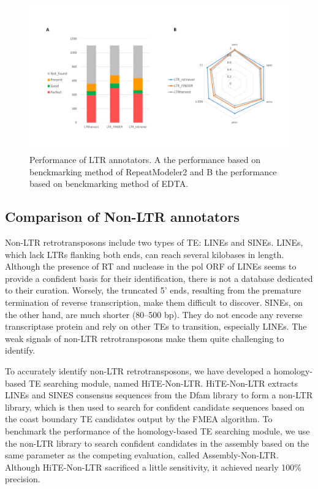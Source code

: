 \documentclass{bmcart}
\begin{document}
\begin{figure}[h!]
	\centerline{\includegraphics[width=1.0\textwidth]{figures/LTRResults.pdf}}
	\caption{Performance of LTR annotators. A the performance based on benckmarking method of RepeatModeler2 and B the performance based on benckmarking method of EDTA.}
	\label{fig:ltr_results}
\end{figure}


\subsection*{Comparison of Non-LTR annotators}
Non-LTR retrotransposons include two types of TE: LINEs and SINEs\cite{zhao2016makes}. LINEs, which lack LTRs flanking both ends, can reach several kilobases in length. Although the presence of RT and nuclease in the pol ORF of LINEs seems to provide a confident basis for their identification, there is not a database dedicated to their curation. Worsely, the truncated 5’ ends, resulting from the premature termination of reverse transcription, make them difficult to discover. SINEs, on the other hand, are much shorter (80–500 bp)\cite{wicker2007unified}. They do not encode any reverse transcriptase protein and rely on other TEs to transition, especially LINEs\cite{dewannieux2003line}. The weak signals of non-LTR retrotransposons make them quite challenging to identify\cite{mao2017sine_scan}.

To accurately identify non-LTR retrotransposons, we have developed a homology-based TE searching module, named HiTE-Non-LTR. HiTE-Non-LTR extracts LINEs and SINES consensus sequences from the Dfam library to form a non-LTR library, which is then used to search for confident candidate sequences based on the coast boundary TE candidates output by the FMEA algorithm. To benchmark the performance of the homology-based TE searching module, we use the non-LTR library to search confident candidates in the assembly based on the same parameter as the competing evaluation, called Assembly-Non-LTR. Although HiTE-Non-LTR sacrificed a little sensitivity, it achieved nearly 100\% precision.
\end{document}
